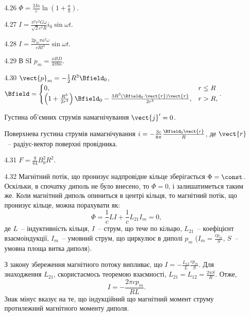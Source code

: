 \begin{Solution}{4.{26}}
	$\Phi = \frac{2Ia}{c}\ln\left( 1 + \frac{a}{b}\right) $.
\end{Solution}
\begin{Solution}{4.{27}}
	$I = \frac{\pi^2 r^2 G \omega}{\sqrt{2}c^2R}i_0\sin\omega t$.
\end{Solution}
\begin{Solution}{4.{28}}
	$I = \frac{2p_m\pi a^2\omega}{cRl^3}\sin\omega t$.
\end{Solution}
\begin{Solution}{4.{29}}
	В SI $p_m = \frac{\phi R D}{4\pi b n}$.
\end{Solution}
\begin{Solution}{4.{30}}
	$\vect{p}_m = - \frac12 R^3\Bfield_0$,
	$
		\Bfield =
		\begin{cases}
			0,                                                                                                & r \le R \\
			\left( 1 + \frac{R^3}{2r^3}\right)\Bfield_0 - \frac{3R^3(\Bfield_0\cdot \vect{r})\vect{r}}{2r^5}, & r > R,
		\end{cases}.
	$

	Густина об'ємних струмів намагнічування $\vect{j}' = 0$.

	Поверхнева густина струмів намагнічування
	$i = -\frac{3c}{8\pi} \frac{\Bfield_0\vect{r}}{R}$,
	де $\vect{r}$~-- радіус-вектор поверхні провідника.
\end{Solution}
\begin{Solution}{4.{31}}
	$F  = \frac{9}{64}B_0^2R^2$.
\end{Solution}
\begin{Solution}{4.{32}}
	Магнітний потік, що пронизує надпровідне кільце зберігається $\Phi = \const$. Оскільки, в спочатку диполь не було внесено, то $\Phi = 0$, і залишатиметься таким же. Коли магнітний диполь опиниться в центрі кільця, то магнітний потік, що пронизує кільце, можна порахувати як:
	\[
		\Phi = \frac1c LI + \frac1c L_{21}I_m = 0,
	\]
	де $L$~-- індуктивність кільця, $I$~-- струм, що тече по кільцю, $L_{21}$~-- коефіцієнт взаємоіндукції, $I_m$~-- умовний струм, що циркулює в диполі $p_m$ ($I_m = \frac{cp_m}{S}$, $S$~-- умовна площа витка диполя).

	З закону збереження магнітного потоку випливає, що $I = - \frac{L_{12}}{L}\frac{cp_m}{S}$.
	Для знаходження $L_{21}$, скористаємось теоремою взаємності, $L_{21} = L_{12} = \frac{2\pi S}{R}$.
	Отже,
	\[
		I = - \frac{ 2\pi c p_m}{RL}.
	\]
	Знак мінус вказує на те, що індукційний що магнітний момент струму протилежний магнітного моменту диполя.
\end{Solution}
